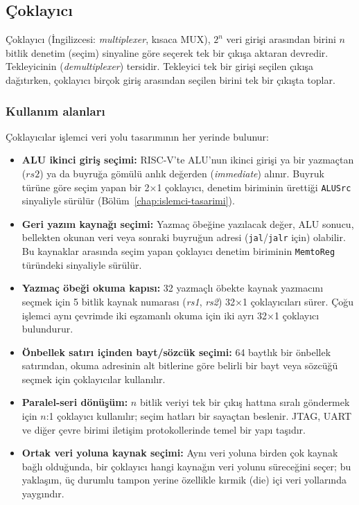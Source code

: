 \subsection{Çoklayıcı}

Çoklayıcı (İngilizcesi: \emph{multiplexer}, kısaca MUX), $2^n$ veri girişi arasından birini $n$ bitlik denetim (seçim) sinyaline göre seçerek tek bir çıkışa aktaran devredir. Tekleyicinin (\emph{demultiplexer}) tersidir. Tekleyici tek bir girişi seçilen çıkışa dağıtırken, çoklayıcı birçok giriş arasından seçilen birini tek bir çıkışta toplar.

\subsubsection{Kullanım alanları}
Çoklayıcılar işlemci veri yolu tasarımının her yerinde bulunur:
\begin{itemize}
  \item \textbf{ALU ikinci giriş seçimi:} RISC-V'te ALU'nun ikinci girişi ya bir yazmaçtan ($rs2$) ya da buyruğa gömülü anlık değerden (\emph{immediate}) alınır. Buyruk türüne göre seçim yapan bir 2×1 çoklayıcı, denetim biriminin ürettiği \texttt{ALUSrc} sinyaliyle sürülür (Bölüm~\ref{chap:islemci-tasarimi}).
  \item \textbf{Geri yazım kaynağı seçimi:} Yazmaç öbeğine yazılacak değer, ALU sonucu, bellekten okunan veri veya sonraki buyruğun adresi (\texttt{jal}/\texttt{jalr} için) olabilir. Bu kaynaklar arasında seçim yapan çoklayıcı denetim biriminin \texttt{MemtoReg} türündeki sinyaliyle sürülür.
  \item \textbf{Yazmaç öbeği okuma kapısı:} 32 yazmaçlı öbekte kaynak yazmacını seçmek için 5 bitlik kaynak numarası (\emph{rs1}, \emph{rs2}) 32×1 çoklayıcıları sürer. Çoğu işlemci aynı çevrimde iki eşzamanlı okuma için iki ayrı 32×1 çoklayıcı bulundurur.
  \item \textbf{Önbellek satırı içinden bayt/sözcük seçimi:} 64 baytlık bir önbellek satırından, okuma adresinin alt bitlerine göre belirli bir bayt veya sözcüğü seçmek için çoklayıcılar kullanılır.
  \item \textbf{Paralel-seri dönüşüm:} $n$ bitlik veriyi tek bir çıkış hattına sıralı göndermek için $n$:1 çoklayıcı kullanılır; seçim hatları bir sayaçtan beslenir. JTAG, UART ve diğer çevre birimi iletişim protokollerinde temel bir yapı taşıdır.
  \item \textbf{Ortak veri yoluna kaynak seçimi:} Aynı veri yoluna birden çok kaynak bağlı olduğunda, bir çoklayıcı hangi kaynağın veri yolunu süreceğini seçer; bu yaklaşım, üç durumlu tampon yerine özellikle kırmik (die) içi veri yollarında yaygındır.
\end{itemize}

